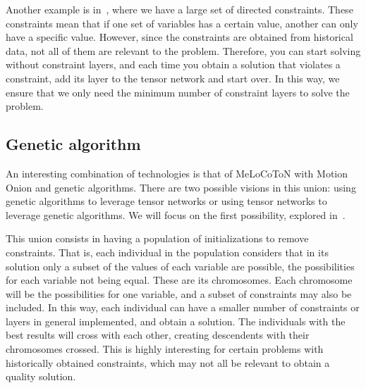 Another example is in~\cite{Task_TN}, where we have a large set of directed constraints. These constraints mean that if one set of variables has a certain value, another can only have a specific value. However, since the constraints are obtained from historical data, not all of them are relevant to the problem. Therefore, you can start solving without constraint layers, and each time you obtain a solution that violates a constraint, add its layer to the tensor network and start over. In this way, we ensure that we only need the minimum number of constraint layers to solve the problem.

\subsection{Genetic algorithm}
An interesting combination of technologies is that of MeLoCoToN with Motion Onion and genetic algorithms. There are two possible visions in this union: using genetic algorithms to leverage tensor networks or using tensor networks to leverage genetic algorithms. We will focus on the first possibility, explored in~\cite{Task_TN}.

This union consists in having a population of initializations to remove constraints. That is, each individual in the population considers that in its solution only a subset of the values of each variable are possible, the possibilities for each variable not being equal. These are its chromosomes. Each chromosome will be the possibilities for one variable, and a subset of constraints may also be included. In this way, each individual can have a smaller number of constraints or layers in general implemented, and obtain a solution. The individuals with the best results will cross with each other, creating descendents with their chromosomes crossed. This is highly interesting for certain problems with historically obtained constraints, which may not all be relevant to obtain a quality solution.



